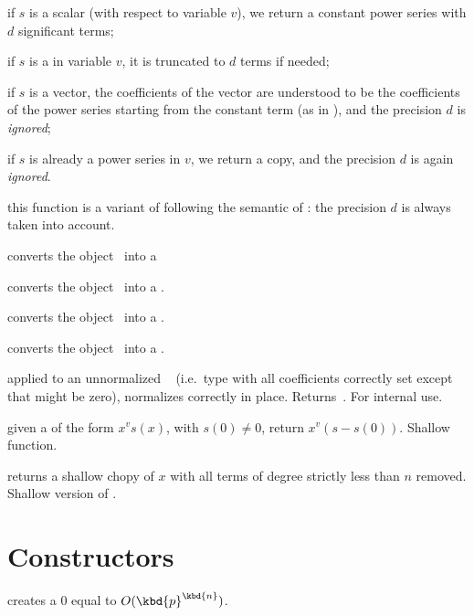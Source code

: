 \item if $s$ is a scalar (with respect to variable $v$),  we return a
constant power series with $d$ significant terms;

\item if $s$ is a  in variable $v$, it is truncated to $d$ terms if
needed;

\item if $s$ is a vector, the coefficients of the vector  are understood to
be the coefficients of the power series starting from the constant term (as
in ), and the precision $d$ is \emph{ignored};

\item if $s$ is already a power series in $v$, we return a copy, and
the precision $d$ is again \emph{ignored}.

 this function is a variant of
 following the semantic of : the precision $d$
is always taken into account.

 converts the object~ into a 

 converts the object~ into a .

 converts the object~ into a .

 converts the object~ into a
.

 applied to an unnormalized ~
(i.e.~type  with all coefficients correctly set except that 
might be zero), normalizes  correctly in place. Returns~.
For internal use.

 given a  of the form $x^v s(x)$, with
$s(0)\neq 0$, return $x^v(s - s(0))$. Shallow function.

 returns a shallow chopy of  $x$
with all terms of degree strictly less than $n$ removed. Shallow
version of .

\section{Constructors}

\label{se:clean}

 creates a $0$  equal to
$O(\kbd{p}^\kbd{n})$.

